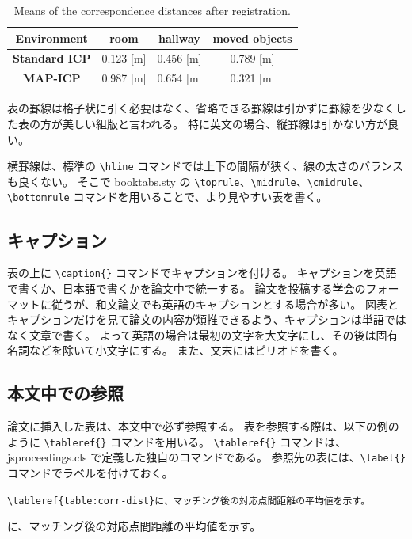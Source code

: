 \documentclass[uplatex, twocolumn, 9pt]{jsproceedings}
\begin{document}
\begin{table}
  \centering
  \caption{Means of the correspondence distances after registration.}
  \label{table:corr-dist}
  \begin{tabular}{cccc}
  \toprule%
  \textbf{Environment} & room & hallway & moved objects\\
  \midrule%
  \textbf{Standard ICP} & 0.123 [m] & 0.456 [m] & 0.789 [m]\\
  \textbf{MAP-ICP} & 0.987 [m] & 0.654 [m] & 0.321 [m]\\
  \bottomrule%
  \end{tabular}
\end{table}

表の罫線は格子状に引く必要はなく、省略できる罫線は引かずに罫線を少なくした表の方が美しい組版と言われる。
特に英文の場合、縦罫線は引かない方が良い。

横罫線は、標準の \verb*|\hline| コマンドでは上下の間隔が狭く、線の太さのバランスも良くない。
そこで booktabs.sty の \verb*|\toprule|、\verb*|\midrule|、\verb*|\cmidrule|、\verb*|\bottomrule| コマンドを用いることで、より見やすい表を書く。

\subsection{キャプション}
表の上に \verb*|\caption{}| コマンドでキャプションを付ける。
キャプションを英語で書くか、日本語で書くかを論文中で統一する。
論文を投稿する学会のフォーマットに従うが、和文論文でも英語のキャプションとする場合が多い。
図表とキャプションだけを見て論文の内容が類推できるよう、キャプションは単語ではなく文章で書く。
よって英語の場合は最初の文字を大文字にし、その後は固有名詞などを除いて小文字にする。
また、文末にはピリオドを書く。

\subsection{本文中での参照}
論文に挿入した表は、本文中で必ず参照する。
表を参照する際は、以下の例のように \verb*|\tableref{}| コマンドを用いる。
\verb*|\tableref{}| コマンドは、jsproceedings.cls で定義した独自のコマンドである。
参照先の表には、\verb*|\label{}| コマンドでラベルを付けておく。
\begin{description}[style=nextline]
  \item[\LaTeX ソース]%
  \verb|\tableref{table:corr-dist}に、マッチング後の対応点間距離の平均値を示す。|
  \item[出力]%
  に、マッチング後の対応点間距離の平均値を示す。
\end{description}
\end{document}
